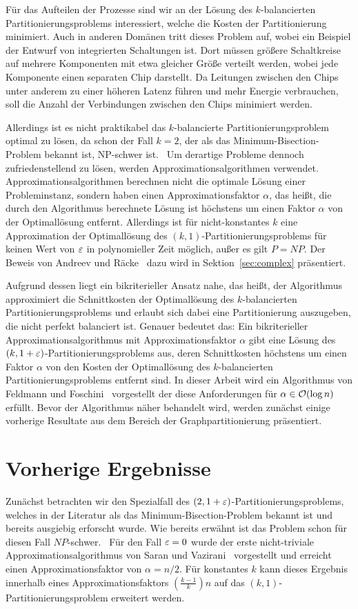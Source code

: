 Für das Aufteilen der Prozesse sind wir an der Lösung des $k$\hyp balancierten Partitionierungsproblems interessiert, welche die Kosten der Partitionierung minimiert.
Auch in anderen Domänen tritt dieses Problem auf, wobei ein Beispiel der Entwurf von integrierten Schaltungen ist.
Dort müssen größere Schaltkreise auf mehrere Komponenten mit etwa gleicher Größe verteilt werden, wobei jede Komponente einen separaten Chip darstellt.
Da Leitungen zwischen den Chips unter anderem zu einer höheren Latenz führen und mehr Energie verbrauchen, soll die Anzahl der Verbindungen zwischen den Chips minimiert werden.

Allerdings ist es nicht praktikabel das $k$\hyp balancierte Partitionierungsproblem optimal zu lösen, da schon der Fall $k=2$, der als das Minimum-Bisection-Problem bekannt ist, NP-schwer ist.~\cite{gj79}
Um derartige Probleme dennoch zufriedenstellend zu lösen, werden Approximationsalgorithmen verwendet.
Approximationsalgorithmen berechnen nicht die optimale Lösung einer Probleminstanz, sondern haben einen Approximationsfaktor $\alpha$, das heißt, die durch den Algorithmus berechnete Lösung ist höchstens um einen Faktor $\alpha$ von der Optimallösung entfernt.
Allerdings ist für nicht-konstantes $k$ eine Approximation der Optimallösung des $(k, 1)$\hyp Partitionierungsproblems für keinen Wert von $\varepsilon$ in polynomieller Zeit möglich, außer es gilt $P=NP$.
Der Beweis von Andreev und Räcke~\cite{ar06} dazu wird in Sektion~\ref{sec:complex} präsentiert.

Aufgrund dessen liegt ein bikriterieller Ansatz nahe, das heißt, der Algorithmus approximiert die Schnittkosten der Optimallösung des $k$\hyp balancierten Partitionierungsproblems und erlaubt sich dabei eine Partitionierung auszugeben, die nicht perfekt balanciert ist.
Genauer bedeutet das: Ein bikriterieller Approximationsalgorithmus mit Approximationsfaktor $\alpha$ gibt eine Lösung des $(k, 1 + \varepsilon)$\hyp Partitionierungsproblems aus, deren Schnittkosten höchstens um einen Faktor $\alpha$ von den Kosten der Optimallösung des $k$\hyp balancierten Partitionierungsproblems entfernt sind.
In dieser Arbeit wird ein Algorithmus von Feldmann und Foschini~\cite{FF15} vorgestellt der diese Anforderungen für $\alpha \in \mathcal{O}(\log n)$ erfüllt.
Bevor der Algorithmus näher behandelt wird, werden zunächst einige vorherige Resultate aus dem Bereich der Graphpartitionierung präsentiert.

\section{Vorherige Ergebnisse}
Zunächst betrachten wir den Spezialfall des $(2, 1 + \varepsilon)$\hyp Partitionierungsproblems, welches in der Literatur als das Minimum-Bisection-Problem bekannt ist und bereits ausgiebig erforscht wurde.
Wie bereits erwähnt ist das Problem schon für diesen Fall $NP$\hyp schwer.~\cite{gj79}
Für den Fall $\varepsilon = 0$ wurde der erste nicht-triviale Approximationsalgorithmus von Saran und Vazirani~\cite{SV91} vorgestellt und erreicht einen Approximationsfaktor von $\alpha = n/2$.
Für konstantes $k$ kann dieses Ergebnis innerhalb eines Approximationsfaktors $\left(\frac{k-1}{k}\right)n$ auf das $(k, 1)$\hyp Partitionierungsproblem erweitert werden.

